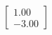 \documentclass[preview]{standalone}
\begin{document}
\begin{align*}
\begin{bmatrix} 1.00 \\ -3.00 \end{bmatrix}
\end{align*}
\end{document}
